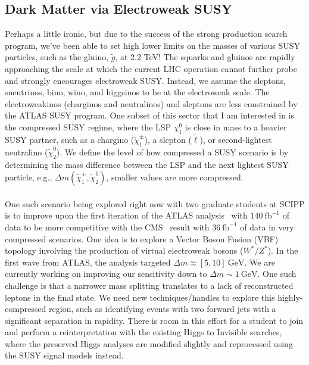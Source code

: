 \documentclass[10pt,a4paper,sans]{moderncv/moderncv} %
\begin{document}
\subsection{Dark Matter via Electroweak SUSY}
Perhaps a little ironic, but due to the success of the strong production search program, we've been able to set high lower limits on the masses of various SUSY particles, such as the gluino, $\tilde{g}$, at 2.2 TeV! The squarks and gluinos are rapidly approaching the scale at which the current LHC operation cannot further probe and strongly encourages electroweak SUSY. Instead, we assume the sleptons, sneutrinos, bino, wino, and higgsinos to be at the electroweak scale. The electroweakinos (charginos and neutralinos) and sleptons are less constrained by the ATLAS SUSY program.  One subset of this sector that I am interested in is the compressed SUSY regime, where the LSP $\chi_1^0$ is close in mass to a heavier SUSY partner, such as a chargino ($\tilde{\chi}_1^\pm$), a slepton ($\tilde{\ell}$), or second-lightest neutralino ($\tilde{\chi}_2^0$). We define the level of how compressed a SUSY scenario is by determining the mass difference between the LSP and the next lightest SUSY particle, e.g., $\Delta m(\tilde{\chi}_1^\pm, \tilde{\chi}_2^0)$, smaller values are more compressed.
\\
\\
One such scenario being explored right now with two graduate students at SCIPP is to improve upon the first iteration of the ATLAS analysis~\cite{ATLAS:2019lng} with $140\ \mathrm{fb}^{-1}$ of data to be more competitive with the CMS~\cite{CMS:2019san} result with $36\ \mathrm{fb}^{-1}$ of data in very compressed scenarios. One idea is to explore a Vector Boson Fusion (VBF) topology involving the production of virtual electroweak bosons ($W^*/ Z^*$). In the first wave from ATLAS, the analysis targeted $\Delta m \approx [5, 10]\ \mathrm{GeV}$. We are currently working on improving our sensitivity down to $\Delta m \sim 1\ \mathrm{GeV}$. One such challenge is that a narrower mass splitting translates to a lack of reconstructed leptons in the final state. We need new techniques/handles to explore this highly-compressed region, such as identifying events with two forward jets with a significant separation in rapidity. There is room in this effort for a student to join and perform a reinterpretation with the existing Higgs to Invisible searches, where the preserved Higgs analyses are modified slightly and reprocessed using the SUSY signal models instead.
\end{document}
